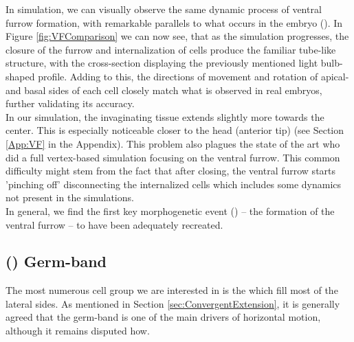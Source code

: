 In simulation, we can visually observe the same dynamic process of ventral furrow formation, with remarkable parallels to what occurs in the embryo (). In Figure \ref{fig:VFComparison} we can now see, that as the simulation progresses, the closure of the furrow and internalization of cells produce the familiar tube-like structure, with the cross-section displaying the previously mentioned light bulb-shaped profile. Adding to this, the directions of movement and rotation of apical- and basal sides of each cell closely match what is observed in real embryos, further validating its accuracy. \\

In our simulation, the invaginating tissue extends slightly more towards the center. This is especially noticeable closer to the head (anterior tip) (see Section \ref{App:VF} in the Appendix). This problem also plagues the state of the art  who did a full vertex-based simulation focusing on the ventral furrow. This common difficulty might stem from the fact that after closing, the ventral furrow starts 'pinching off' disconnecting the internalized cells which includes some dynamics not present in the simulations.\cite{supatto2008quantitative}\\
In general, we find the first key morphogenetic event () -- the formation of the ventral furrow --  to have been adequately recreated.

\subsection{() Germ-band}
The most numerous cell group we are interested in is the  which fill most of the lateral sides. As mentioned in Section \ref{sec:ConvergentExtension}, it is generally agreed that the germ-band is one of the main drivers of horizontal motion, although it remains disputed how.\cite{davies2023mechanisms}


